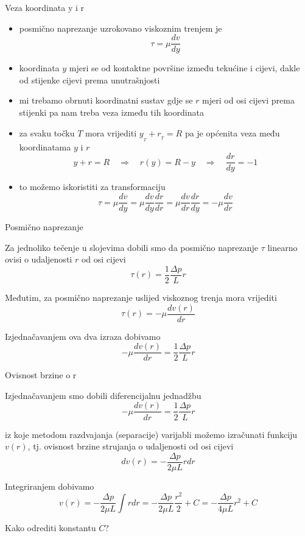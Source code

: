 \documentclass[croatian]{beamer}
\begin{document}
\begin{frame}{Veza koordinata y i r}

\begin{itemize}
\item posmično naprezanje uzrokovano viskoznim trenjem je
\[
\tau=\mu\frac{dv}{dy}
\]
\item koordinata $y$ mjeri se od kontaktne površine između tekućine i cijevi,
dakle od stijenke cijevi prema unutrašnjosti
\item mi trebamo obrnuti koordinatni sustav gdje se $r$ mjeri od osi cijevi
prema stijenki pa nam treba veza između tih koordinata
\item za svaku točku $T$ mora vrijediti $y_{_{T}}+r_{_{T}}=R$ pa je općenita
veza među koordinatama $y$ i $r$
\[
y+r=R\quad\Rightarrow\quad r(y)=R-y\quad\Rightarrow\quad\frac{dr}{dy}=-1
\]
\item to možemo iskoristiti za transformaciju
\[
\tau=\mu\frac{dv}{dy}=\mu\frac{dv}{dy}\frac{dr}{dr}=\mu\frac{dv}{dr}\frac{dr}{dy}=-\mu\frac{dv}{dr}
\]
\end{itemize}
\end{frame}

\begin{frame}{Posmično naprezanje}

Za jednoliko tečenje u slojevima dobili smo da posmično naprezanje
$\tau$ linearno ovisi o udaljenosti $r$ od osi cijevi 
\[
\tau(r)=\frac{1}{2}\frac{\Delta p}{L}r
\]

Međutim, za posmično naprezanje uslijed viskoznog trenja mora vrijediti
\[
\tau(r)=-\mu\frac{dv(r)}{dr}
\]

Izjednačavanjem ova dva izraza dobivamo
\[
-\mu\frac{dv(r)}{dr}=\frac{1}{2}\frac{\Delta p}{L}r
\]

\end{frame}

\begin{frame}{Ovisnost brzine o r}

Izjednačavanjem smo dobili diferencijalnu jednadžbu 
\[
-\mu\frac{dv(r)}{dr}=\frac{1}{2}\frac{\Delta p}{L}r
\]

iz koje metodom razdvajanja (separacije) varijabli možemo izračunati
funkciju $v(r)$, tj. ovisnost brzine strujanja o udaljenosti od osi
cijevi 
\[
dv(r)=-\frac{\Delta p}{2\mu L}rdr
\]

Integriranjem dobivamo
\[
v(r)=-\frac{\Delta p}{2\mu L}\int rdr=-\frac{\Delta p}{2\mu L}\frac{r^{2}}{2}+C=-\frac{\Delta p}{4\mu L}r^{2}+C
\]

Kako odrediti konstantu $C$?
\end{frame}
\end{document}
